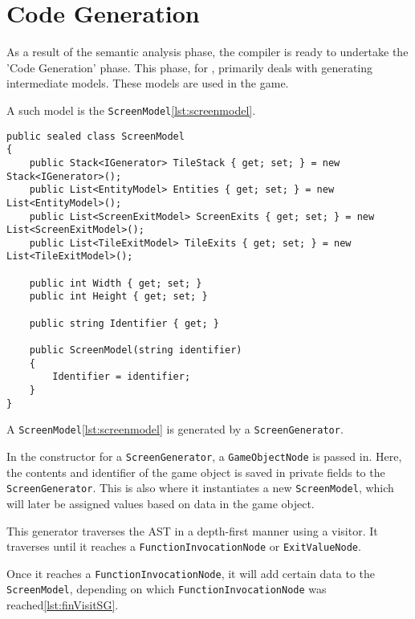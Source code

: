 \section{Code Generation} \label{sec:code_generation}
As a result of the semantic analysis phase, the \dazel{} compiler is ready to undertake the 'Code Generation' phase.
This phase, for \dazel{}, primarily deals with generating intermediate models. These models are used in the \dazel{} game.

A such model is the \texttt{ScreenModel}\ref{lst:screenmodel}.

\begin{lstlisting}[language=CSharp, label={lst:screenmodel}, caption={ScreenModel}]
public sealed class ScreenModel
{
    public Stack<IGenerator> TileStack { get; set; } = new Stack<IGenerator>();
    public List<EntityModel> Entities { get; set; } = new List<EntityModel>();
    public List<ScreenExitModel> ScreenExits { get; set; } = new List<ScreenExitModel>();
    public List<TileExitModel> TileExits { get; set; } = new List<TileExitModel>();

    public int Width { get; set; }
    public int Height { get; set; }
    
    public string Identifier { get; }

    public ScreenModel(string identifier)
    {
        Identifier = identifier;
    }
}
\end{lstlisting}

A \texttt{ScreenModel}\ref{lst:screenmodel} is generated by a \texttt{ScreenGenerator}.

In the constructor for a \texttt{ScreenGenerator}, a \texttt{GameObjectNode} is passed in. Here, the contents and identifier of the game object is saved in private fields to the \texttt{ScreenGenerator}. This is also where it instantiates a new \texttt{ScreenModel}, which will later be assigned values based on data in the game object.  

This generator traverses the AST in a depth-first manner using a visitor. It traverses until it reaches a \texttt{FunctionInvocationNode} or \texttt{ExitValueNode}.

Once it reaches a \texttt{FunctionInvocationNode}, it will add certain data to the \texttt{ScreenModel}, depending on which \texttt{FunctionInvocationNode} was reached\ref{lst:finVisitSG}.

